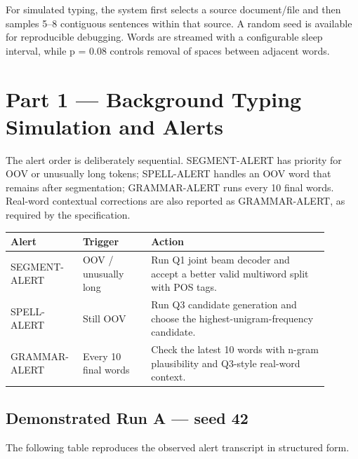 \documentclass[11pt]{article}
\begin{document}
For simulated typing, the system first selects a source document/file and then samples 5--8 contiguous sentences within that source. A random seed is available for reproducible debugging. Words are streamed with a configurable sleep interval, while p = 0.08 controls removal of spaces between adjacent words.

\section{Part 1 --- Background Typing Simulation and Alerts}

The alert order is deliberately sequential. SEGMENT-ALERT has priority for OOV or unusually long tokens; SPELL-ALERT handles an OOV word that remains after segmentation; GRAMMAR-ALERT runs every 10 final words. Real-word contextual corrections are also reported as GRAMMAR-ALERT, as required by the specification.

\begin{longtable}{@{}p{0.18\linewidth}p{0.20\linewidth}p{0.52\linewidth}@{}}
\toprule
\textbf{Alert} & \textbf{Trigger} & \textbf{Action} \\
\midrule
\endhead
SEGMENT-ALERT & OOV / unusually long & Run Q1 joint beam decoder and accept a better valid multiword split with POS tags. \\
SPELL-ALERT & Still OOV & Run Q3 candidate generation and choose the highest-unigram-frequency candidate. \\
GRAMMAR-ALERT & Every 10 final words & Check the latest 10 words with n-gram plausibility and Q3-style real-word context. \\
\bottomrule
\end{longtable}

\subsection{Demonstrated Run A --- seed 42}

The following table reproduces the observed alert transcript in structured form.
\end{document}
